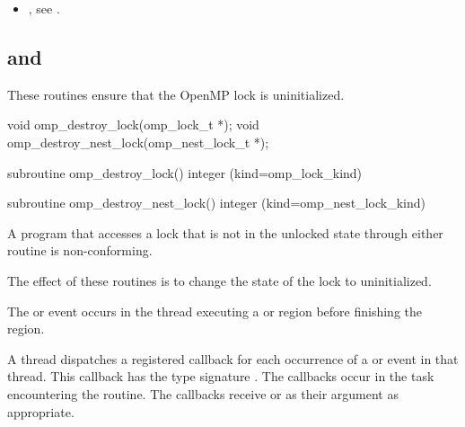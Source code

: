 \crossreferences
\begin{itemize}
\item {}, see
.
\end{itemize}



\subsection[\code{omp\_destroy\_lock} and \code{omp\_destroy\_nest\_lock}]{ and\\ }
\label{subsec:omp_destroy_lock and omp_destroy_nest_lock}
\summary
These routines ensure that the OpenMP lock is uninitialized.

\format
\begin{ccppspecific}
\begin{boxedcode}
void omp\_destroy\_lock(omp\_lock\_t *);
void omp\_destroy\_nest\_lock(omp\_nest\_lock\_t *);
\end{boxedcode}
\end{ccppspecific}

\begin{fortranspecific}
\begin{boxedcode}
subroutine omp\_destroy\_lock()
integer (kind=omp\_lock\_kind) 

subroutine omp\_destroy\_nest\_lock()
integer (kind=omp\_nest\_lock\_kind) 
\end{boxedcode}
\end{fortranspecific}

\constraints
A program that accesses a lock that is not in the unlocked state through either routine is 
non-conforming.

\effect
The effect of these routines is to change the state of the lock to uninitialized.

\events

The  or  event occurs in the thread 
executing a  or  region
before finishing the region.

\tools

A thread dispatches a registered 
callback for each occurrence of a  or  event 
in that thread.  This callback has the type signature .
The callbacks occur in the task encountering the routine.
The callbacks receive  or 
  as their  argument as appropriate.


